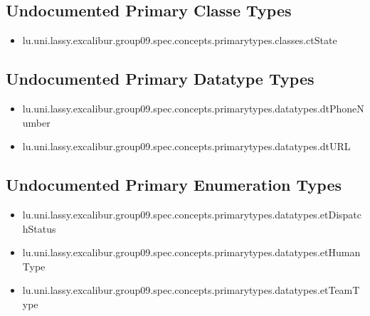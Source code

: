 \subsection[Undocumented Primary Classe Types]{Undocumented Primary Classe Types}
\begin{itemize}
\item lu.uni.lassy.excalibur.group09.spec.concepts.primarytypes.classes.ctState 
\end{itemize}

\subsection[Undocumented Primary Datatype Types]{Undocumented Primary Datatype Types}
\begin{itemize}
\item lu.uni.lassy.excalibur.group09.spec.concepts.primarytypes.datatypes.dtPhoneNumber 
\item lu.uni.lassy.excalibur.group09.spec.concepts.primarytypes.datatypes.dtURL 
\end{itemize}

\subsection[Undocumented Primary Enumeration Types]{Undocumented Primary Enumeration Types}
\begin{itemize}
\item lu.uni.lassy.excalibur.group09.spec.concepts.primarytypes.datatypes.etDispatchStatus 
\item lu.uni.lassy.excalibur.group09.spec.concepts.primarytypes.datatypes.etHumanType 
\item lu.uni.lassy.excalibur.group09.spec.concepts.primarytypes.datatypes.etTeamType 
\end{itemize}
















